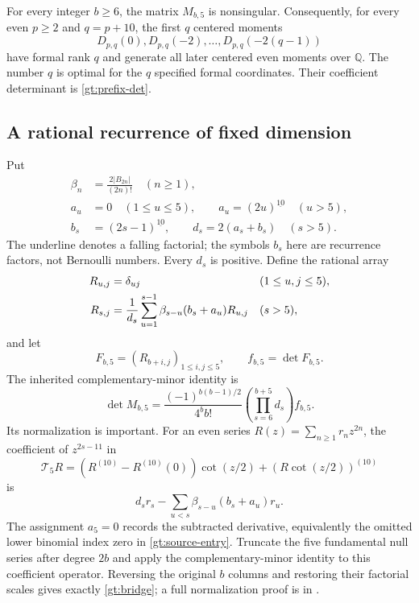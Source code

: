 \begin{theorem}
\label{gt:main}
For every integer $b\ge6$, the matrix $M_{b,5}$ is nonsingular.
Consequently, for every even $p\ge2$ and $q=p+10$, the first $q$
centered moments
\[
 D_{p,q}(0),D_{p,q}(-2),\ldots,D_{p,q}(-2(q-1))
\]
have formal rank $q$ and generate all later centered even moments
over $\mathbb Q$. The number $q$ is optimal for the $q$ specified
formal coordinates. Their coefficient determinant is
\eqref{gt:prefix-det}.
\end{theorem}

\subsection{A rational recurrence of fixed dimension}

Put
\begin{align*}
 \beta_n&=\frac{2|B_{2n}|}{(2n)!}\quad(n\ge1),\\
 a_u&=0\quad(1\le u\le5),\qquad
 a_u=(2u)^{\underline{10}}\quad(u>5),\\
 b_s&=(2s-1)^{\underline{10}},\qquad
 d_s=2(a_s+b_s)\quad(s>5).
\end{align*}
The underline denotes a falling factorial; the symbols $b_s$ here
are recurrence factors, not Bernoulli numbers. Every $d_s$ is positive.
Define the rational array
\begin{align}
 R_{u,j}&=\delta_{uj}&&(1\le u,j\le5),\notag\\
 R_{s,j}&=\frac1{d_s}\sum_{u=1}^{s-1}
             \beta_{s-u}(b_s+a_u)R_{u,j}&&(s>5),
 \label{gt:recurrence}
\end{align}
and let
\[
 F_{b,5}=(R_{b+i,j})_{1\le i,j\le5},\qquad f_{b,5}=\det F_{b,5}.
\]
The inherited complementary-minor identity is
\begin{equation}\label{gt:bridge}
 \det M_{b,5}=
 \frac{(-1)^{b(b-1)/2}}{4^bb!}
            \left(\prod_{s=6}^{b+5}d_s\right)f_{b,5}.
\end{equation}
Its normalization is important. For an even series
$R(z)=\sum_{n\ge1}r_nz^{2n}$, the coefficient of $z^{2s-11}$ in
\begin{equation}\label{gt:null}
 \mathcal T_5R=(R^{(10)}-R^{(10)}(0))\cot(z/2)
                               +(R\cot(z/2))^{(10)}
\end{equation}
is
\[
 d_sr_s-\sum_{u<s}\beta_{s-u}(b_s+a_u)r_u.
\]
The assignment $a_5=0$ records the subtracted derivative, equivalently
the omitted lower binomial index zero in \eqref{gt:source-entry}.
Truncate the five fundamental null series after degree $2b$ and
apply the complementary-minor identity to this coefficient operator.
Reversing the original $b$ columns and restoring their factorial
scales gives exactly \eqref{gt:bridge}; a full normalization proof
is in \cite[Gamma-basis section]{OrderedBoundary}.

